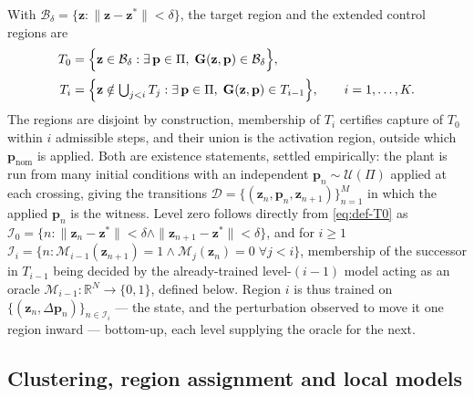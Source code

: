 With $\mathcal{B}_\delta=\{\mathbf{z}:\|\mathbf{z}-\mathbf{z}^{*}\|<\delta\}$,
the target region and the extended control regions are
%
\begin{align}
T_0&=\Bigl\{\mathbf{z}\in\mathcal{B}_\delta:\exists\,\mathbf{p}\in\Pi,\;
\mathbf{G}(\mathbf{z},\mathbf{p})\in\mathcal{B}_\delta\Bigr\},
\label{eq:def-T0}\\[2pt]
T_i&=\Bigl\{\mathbf{z}\notin\textstyle\bigcup_{j<i}T_j:\exists\,\mathbf{p}\in\Pi,\;
\mathbf{G}(\mathbf{z},\mathbf{p})\in T_{i-1}\Bigr\},
\qquad i=1,\dots,K .
\label{eq:def-Ti}
\end{align}
%
The regions are disjoint by construction, membership of $T_i$ certifies capture
of $T_0$ within $i$ admissible steps, and their union is the activation region,
outside which $\mathbf{p}_{\mathrm{nom}}$ is applied. Both are existence
statements, settled empirically: the plant is run from many initial conditions
with an independent $\mathbf{p}_n\sim\mathcal{U}(\Pi)$ applied at each
crossing, giving the transitions
$\mathcal{D}=\{(\mathbf{z}_n,\mathbf{p}_n,\mathbf{z}_{n+1})\}_{n=1}^{M}$ in
which the applied $\mathbf{p}_n$ is the witness. Level zero follows directly
from \eqref{eq:def-T0} as
$\mathcal{I}_0=\{n:\|\mathbf{z}_n-\mathbf{z}^{*}\|<\delta\wedge
\|\mathbf{z}_{n+1}-\mathbf{z}^{*}\|<\delta\}$, and for $i\ge1$
$\mathcal{I}_i=\{n:\mathcal{M}_{i-1}(\mathbf{z}_{n+1})=1\wedge
\mathcal{M}_{j}(\mathbf{z}_{n})=0\;\forall j<i\}$, membership of the successor
in $T_{i-1}$ being decided by the already-trained level-$(i-1)$ model acting as
an oracle $\mathcal{M}_{i-1}:\mathbb{R}^{N}\to\{0,1\}$, defined below. Region
$i$ is thus trained on
$\{(\mathbf{z}_n,\Delta\mathbf{p}_n)\}_{n\in\mathcal{I}_i}$ --- the state, and
the perturbation observed to move it one region inward --- bottom-up, each
level supplying the oracle for the next.

\subsection{Clustering, region assignment and local models}
\label{subsec:ecr-clustering}

